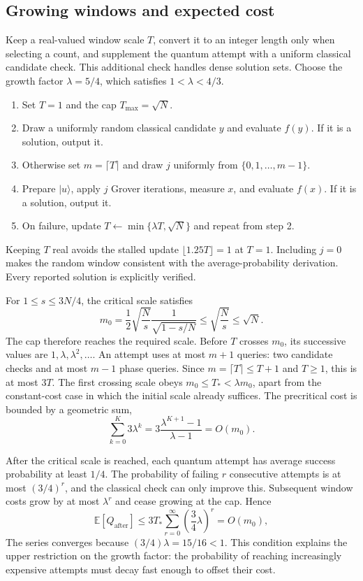 \documentclass[11pt,oneside,openany]{book}
\providecommand{\ket}{}
\renewcommand{\ket}[1]{\lvert #1\rangle}
\theoremstyle{definition}
\begin{document}
\subsection{Growing windows and expected cost}

Keep a real-valued window scale $T$, convert it to an integer length only when selecting a count, and supplement the quantum attempt with a uniform classical candidate check. This additional check handles dense solution sets. Choose the growth factor $\lambda=5/4$, which satisfies $1<\lambda<4/3$.

\begin{enumerate}
 \item Set $T=1$ and the cap $T_{\max}=\sqrt N$.
 \item Draw a uniformly random classical candidate $y$ and evaluate $f(y)$. If it is a solution, output it.
 \item Otherwise set $m=\lceil T\rceil$ and draw $j$ uniformly from $\{0,1,\ldots,m-1\}$.
 \item Prepare $\ket u$, apply $j$ Grover iterations, measure $x$, and evaluate $f(x)$. If it is a solution, output it.
 \item On failure, update $T\leftarrow\min\{\lambda T,\sqrt N\}$ and repeat from step 2.
\end{enumerate}
Keeping $T$ real avoids the stalled update $\lfloor1.25T\rfloor=1$ at $T=1$. Including $j=0$ makes the random window consistent with the average-probability derivation. Every reported solution is explicitly verified.

For $1\le s\le3N/4$, the critical scale satisfies
\begin{equation}
 m_0=\frac12\sqrt{\frac Ns}\frac1{\sqrt{1-s/N}}
 \leq\sqrt{\frac Ns}\leq\sqrt N.
\end{equation}
The cap therefore reaches the required scale. Before $T$ crosses $m_0$, its successive values are $1,\lambda,\lambda^2,\ldots$. An attempt uses at most $m+1$ queries: two candidate checks and at most $m-1$ phase queries. Since $m=\lceil T\rceil\le T+1$ and $T\ge1$, this is at most $3T$. The first crossing scale obeys $m_0\le T_*<\lambda m_0$, apart from the constant-cost case in which the initial scale already suffices. The precritical cost is bounded by a geometric sum,
\begin{equation}
 \sum_{k=0}^{K}3\lambda^k
 =3\frac{\lambda^{K+1}-1}{\lambda-1}=O(m_0).
\end{equation}

After the critical scale is reached, each quantum attempt has average success probability at least $1/4$. The probability of failing $r$ consecutive attempts is at most $(3/4)^r$, and the classical check can only improve this. Subsequent window costs grow by at most $\lambda^r$ and cease growing at the cap. Hence
\begin{equation}
 \mathbb E[Q_{\mathrm{after}}]
 \leq 3T_*\sum_{r=0}^{\infty}\left(\frac34\lambda\right)^r
 =O(m_0),
 \label{eq:search-growing-tail}
\end{equation}
The series converges because $(3/4)\lambda=15/16<1$. This condition explains the upper restriction on the growth factor: the probability of reaching increasingly expensive attempts must decay fast enough to offset their cost.
\end{document}
